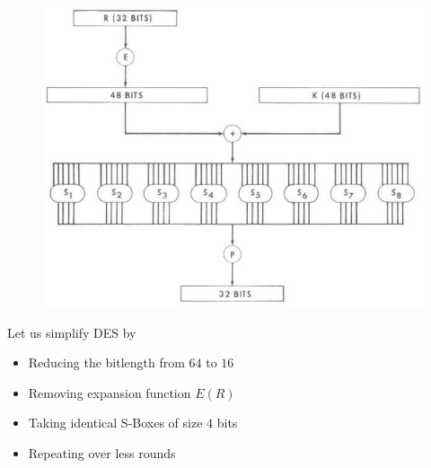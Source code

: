 \documentclass[9pt]{beamer}
\begin{document}
\begin{frame}
\begin{columns}
\begin{column}{0.6\textwidth}
\begin{figure}
\includegraphics[totalheight=0.55\textheight]{des_feistel.jpg}
\end{figure}
Let us simplify DES by
\begin{itemize}
\item{Reducing the bitlength from $64$ to $16$}
\item{Removing expansion function $E(R)$}
\item{Taking identical S-Boxes of size $4$ bits}
\item{Repeating over less rounds}
\end{itemize}
\end{column}


\end{columns}
\end{frame}
\end{document}
